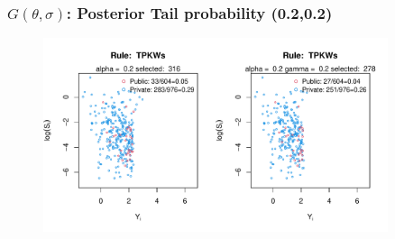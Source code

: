 \documentclass[10pt,mathserif,aspectratio=169]{beamer}
\begin{document}
\begin{frame}
  \frametitle{$G(\theta,\sigma)$: Posterior Tail probability (0.2,0.2)}
  \begin{figure}
    \centering
    \includegraphics[width=0.9\textwidth]{../../Figures/2013-2022/GMM_fd/GLVmix/Left_0.2_0.2_TPKWs.pdf}
  \end{figure}
\end{frame}



\end{document}
